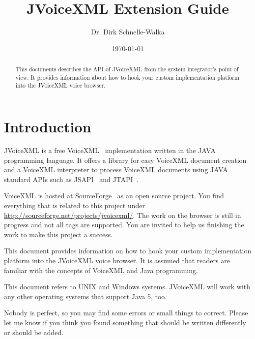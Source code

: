 \documentclass[11pt,a4paper]{article}
\title{JVoiceXML Extension Guide}
\author{Dr. Dirk Schnelle-Walka}
\date{\today}
\begin{document}
\pagestyle{empty}

\maketitle

\pagestyle{headings}

\tableofcontents

\newpage

\begin{abstract}
This documents describes the API of JVoiceXML from the system integrator's point
of view. It provides information about how to hook your custom implementation
platform into the JVoiceXML voice browser.
\end{abstract}


\section{Introduction}
\label{sec:introduction}

JVoiceXML is a free VoiceXML~\cite{w3.org:voicexml} implementation written in 
the JAVA programming language. It offers a library for easy VoiceXML
document creation and a VoiceXML interpreter to process 
VoiceXML documents using JAVA standard APIs such as JSAPI~\cite{sun:jsapi} and
JTAPI~\cite{sun:jsapi}.

VoiceXML is hosted at SourceForge~\cite{sourceforge} as an open source project.
You find everything that is related to this project under
\url{http://sourceforge.net/projects/jvoicexml/}.
The work on the browser is still in progress and not all tags are
supported. You are invited to help us finishing the work to make this
project a success.

This document provides information on how to hook your custom implementation
platform into the JVoiceXML voice browser. It is assumed that readers are
familiar with the concepts of VoiceXML and Java programming.

This document refers to UNIX and Windows systems. JVoiceXML will work with 
any other operating systems that support Java 5, too.

Nobody is perfect, so you may find some errors or small things to correct.
Please let me know if you think you found something that should be written
differently or should be added.
\end{document}
